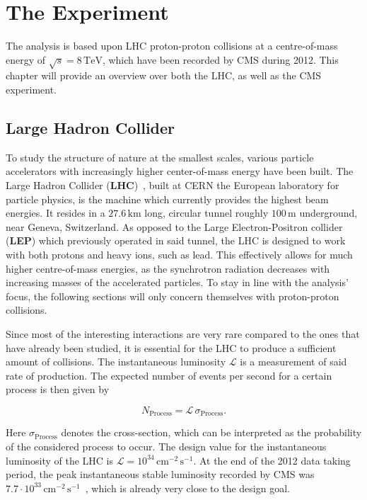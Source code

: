 \chapter{The Experiment}
\label{cha:experiment}

The analysis is based upon LHC proton-proton collisions at a centre-of-mass energy of $\sqrt{s} = 8\,\text{TeV}$, which have been recorded by CMS during 2012. This chapter will provide an overview over both the LHC, as well as the CMS experiment.


\section{Large Hadron Collider}
\label{sec:lhc} 

To study the structure of nature at the smallest scales, various particle accelerators with increasingly higher center-of-mass energy have been built. The Large Hadron Collider (\textbf{LHC})~\cite{lhcjinst}, built at CERN the European laboratory for particle physics, is the machine which currently provides the highest beam energies. It resides in a $27.6\,\text{km}$ long, circular tunnel roughly $100\,\text{m}$ underground, near Geneva, Switzerland. As opposed to the Large Electron-Positron collider (\textbf{LEP}) which previously operated in said tunnel, the LHC is designed to work with both protons and heavy ions, such as lead. This effectively allows for much higher centre-of-mass energies, as the synchrotron radiation decreases with increasing masses of the accelerated particles. To stay in line with the analysis' focus, the following sections will only concern themselves with proton-proton collisions.

Since most of the interesting interactions are very rare compared to the ones that have already been studied, it is essential for the LHC to produce a sufficient amount of collisions. The instantaneous luminosity $\mathcal{L}$ is a measurement of said rate of production. The expected number of events per second for a certain process is then given by

\begin{equation}
  \label{eq:instlumi}
  N_{\text{Process}} = \mathcal{L}\,\sigma_{\text{Process}}.
\end{equation}

\noindent Here $\sigma_{\text{Process}}$ denotes the cross-section, which can be interpreted as the probability of the considered process to occur. The design value for the instantaneous luminosity of the LHC is $\mathcal{L} = 10^{34}\,\text{cm}^{-2}\,\text{s}^{-1}$. At the end of the 2012 data taking period, the peak instantaneous stable luminosity recorded by CMS was $7.7 \cdot 10^{33}\,\text{cm}^{-2}\,\text{s}^{-1}$~\cite{cmslumi}, which is already very close to the design goal.


